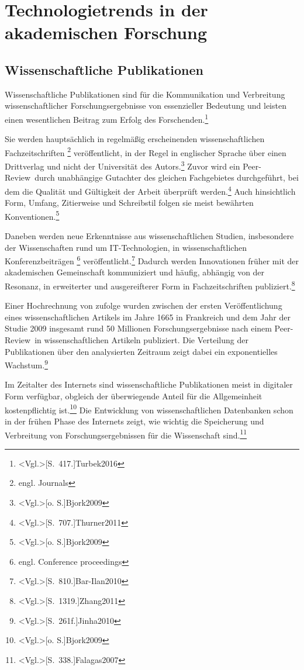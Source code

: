 \section{Technologietrends in der akademischen Forschung}
\subsection{Wissenschaftliche Publikationen}\label{sec:acad_pub}
Wissenschaftliche Publikationen sind für die Kommunikation und Verbreitung wissenschaftlicher Forschungsergebnisse von essenzieller Bedeutung und leisten einen wesentlichen Beitrag zum Erfolg des Forschenden.\footnote{\citeNP<Vgl.>[S.~417.]{Turbek2016}}

Sie werden hauptsächlich in regelmäßig erscheinenden wissenschaftlichen Fachzeitschriften \footnote{engl. Journals} veröffentlicht, in der Regel in englischer Sprache über einen Drittverlag und nicht der Universität des Autors.\footnote{\citeNP<Vgl.>[o. S.]{Bjork2009}} Zuvor wird ein \glqq Peer-Review\grqq~durch unabhängige Gutachter des gleichen Fachgebietes durchgeführt, bei dem die Qualität und Gültigkeit der Arbeit überprüft werden.\footnote{\citeNP<Vgl.>[S.~707.]{Thurner2011}} Auch hinsichtlich Form, Umfang, Zitierweise und Schreibstil folgen sie meist bewährten Konventionen.\footnote{\citeNP<Vgl.>[o. S.]{Bjork2009}}

Daneben werden neue Erkenntnisse aus wissenschaftlichen Studien, insbesondere der Wissenschaften rund um IT-Technologien, in wissenschaftlichen Konferenzbeiträgen \footnote{engl. Conference proceedings} veröffentlicht.\footnote{\citeNP<Vgl.>[S.~810.]{Bar-Ilan2010}} Dadurch werden Innovationen früher mit der akademischen Gemeinschaft kommuniziert und häufig, abhängig von der Resonanz, in erweiterter und ausgereifterer Form in Fachzeitschriften publiziert.\footnote{\citeNP<Vgl.>[S.~1319.]{Zhang2011}}

Einer Hochrechnung von  zufolge wurden zwischen der ersten Veröffentlichung eines wissenschaftlichen Artikels im Jahre 1665 in Frankreich und dem Jahr der Studie 2009 insgesamt rund 50 Millionen Forschungsergebnisse nach einem \glqq Peer-Review\grqq~in wissenschaftlichen Artikeln publiziert. Die Verteilung der Publikationen über den analysierten Zeitraum zeigt dabei ein exponentielles Wachstum.\footnote{\citeNP<Vgl.>[S.~261f.]{Jinha2010}}

Im Zeitalter des Internets sind wissenschaftliche Publikationen meist in digitaler Form verfügbar, obgleich der überwiegende Anteil für die Allgemeinheit kostenpflichtig ist.\footnote{\citeNP<Vgl.>[o. S.]{Bjork2009}} Die Entwicklung von wissenschaftlichen Datenbanken schon in der frühen Phase des Internets zeigt, wie wichtig die Speicherung und Verbreitung von Forschungsergebnissen für die Wissenschaft sind.\footnote{\citeNP<Vgl.>[S.~338.]{Falagas2007}}

